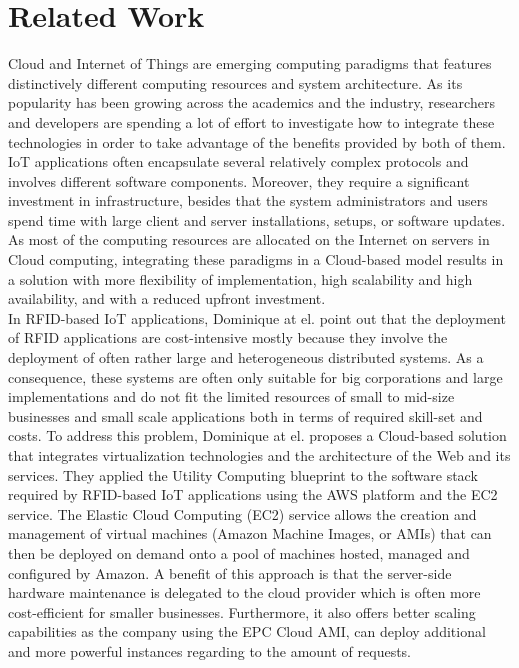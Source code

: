 \documentclass{../../llncs2e/llncs}
\begin{document}
\section*{Related Work}
\label{sec:Related Work}
  Cloud and Internet of Things are emerging computing paradigms that features distinctively different computing resources
  and system architecture. As its popularity has been growing across the academics and the industry, researchers and developers
  are spending a lot of effort to investigate how to integrate these technologies in order to take advantage of the benefits
  provided by both of them.\\
  IoT applications often encapsulate several relatively complex protocols and involves different software components. Moreover,
  they require a significant investment in infrastructure, besides that the system administrators and users spend time with large
  client and server installations, setups, or software updates. As most of the computing resources are allocated on the Internet on servers
  in Cloud computing, integrating these paradigms in a Cloud-based model results in a solution with more flexibility of implementation,
  high scalability and high availability, and with a reduced upfront investment.\\

  In RFID-based IoT applications, Dominique at el. \cite{guinard2011cloud} point out that the deployment of RFID applications are cost-intensive mostly
  because they involve the deployment of often rather large and heterogeneous distributed systems. As a consequence, these systems are often only
  suitable for big corporations and large implementations and do not fit the limited resources of small to mid-size businesses and small scale
  applications both in terms of required skill-set and costs. To address this problem, Dominique at el. proposes a Cloud-based solution that
  integrates virtualization technologies and the architecture of the Web and its services. They applied the Utility Computing blueprint to the
  software stack required by RFID-based IoT applications using the AWS platform and the EC2 service. The Elastic Cloud Computing (EC2) service
  allows the creation and management of virtual machines (Amazon Machine Images, or AMIs) that can then be deployed on
  demand onto a pool of machines hosted, managed and configured by Amazon. A benefit of this approach is that the server-side hardware
  maintenance is delegated to the cloud provider which is often more cost-efficient for smaller businesses. Furthermore,
  it also offers better scaling capabilities as the company using the EPC Cloud AMI, can deploy additional and more powerful instances regarding
  to the amount of requests.\\
\end{document}
